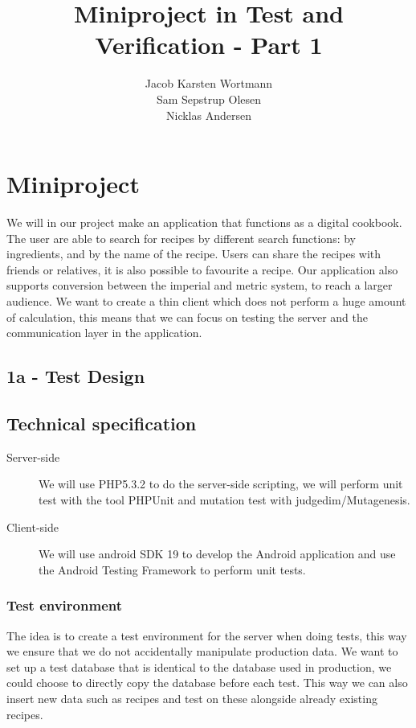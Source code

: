 \documentclass[a4paper,12pt]{memoir}
\title{Miniproject in Test and Verification - Part 1}
\author{Jacob Karsten Wortmann\\Sam Sepstrup Olesen\\Nicklas Andersen}
\begin{document}
\maketitle
\chapter*{Miniproject}
We will in our project make an application that functions as a digital cookbook. The user are able to search for recipes by different search functions: by ingredients, and by the name of the recipe. Users can share the recipes with friends or relatives, it is also possible to favourite a recipe. Our  application also supports conversion between the imperial and metric system, to reach a larger audience. 
We want to create a thin client which does not perform a huge amount of calculation, this means that we can focus on testing the server and the communication layer in the application.

\section*{1a - Test Design}
\section*{Technical specification}
\begin{description}
    \item[Server-side]
        We will use PHP5.3.2 to do the server-side scripting,
        we will perform unit test with the tool PHPUnit and mutation test with judgedim/Mutagenesis.
    \item[Client-side]
        We will use android SDK 19 to develop the Android application and use the Android Testing Framework to perform unit tests.
\end{description}

\subsection{Test environment}
The idea is to create a test environment for the server when doing tests, this way we ensure that we do not accidentally manipulate production data. We want to set up a test database that is identical to the database used in production, we could choose to directly copy the database before each test. This way we can also insert new data such as recipes and test on these alongside already existing recipes.
\end{document}

